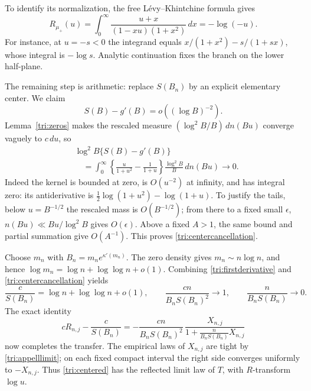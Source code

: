To identify its normalization, the free Lévy--Khintchine formula gives
\[
 R_{\mu_+}(u)=\int_0^\infty
                  \frac{u+x}{(1-xu)(1+x^2)}\,dx=-\log(-u).
\]
For instance, at $u=-s<0$ the integrand equals
$x/(1+x^2)-s/(1+sx)$, whose integral is $-\log s$.
Analytic continuation fixes the branch on the lower half-plane.

The remaining step is arithmetic: replace $S(B_n)$ by an explicit
elementary center.  We claim
\begin{equation}\label{tri:centercancellation}
 S(B)-g'(B)=o((\log B)^{-2}).
\end{equation}
Lemma~\ref{tri:zeros} makes the rescaled measure
$(\log^2B/B)\,dn(Bu)$ converge vaguely to $c\,du$, so
\[
 \begin{split}
 &\log^2B\{S(B)-g'(B)\}\\
 &\quad=\int_0^\infty
 \left\{\frac u{1+u^2}-\frac1{1+u}\right\}
               \frac{\log^2B}{B}\,dn(Bu)
 \longrightarrow0.
 \end{split}
\]
Indeed the kernel is bounded at zero, is $O(u^{-2})$ at infinity,
and has integral zero: its antiderivative is
$\tfrac12\log(1+u^2)-\log(1+u)$.
To justify the tails, below $u=B^{-1/2}$ the rescaled mass is
$O(B^{-1/2})$; from there to a fixed small $\epsilon$,
$n(Bu)\ll Bu/\log^2B$ gives $O(\epsilon)$.
Above a fixed $A>1$, the same bound and partial summation give
$O(A^{-1})$.  This proves \eqref{tri:centercancellation}.

Choose $m_n$ with $B_n=m_ne^{\kappa'(m_n)}$.
The zero density gives $m_n\sim n\log n$, and hence
$\log m_n=\log n+\log\log n+o(1)$.
Combining \eqref{tri:firstderivative} and
\eqref{tri:centercancellation} yields
\begin{equation}\label{tri:center}
 \frac c{S(B_n)}=\log n+\log\log n+o(1),\qquad
 \frac{cn}{B_nS(B_n)^2}\to1,\qquad
 \frac n{B_nS(B_n)}\to0.
\end{equation}
The exact identity
\[
 cR_{n,j}-\frac c{S(B_n)}
 =-\frac{cn}{B_nS(B_n)^2}\,
       \frac{X_{n,j}}{1+\frac n{B_nS(B_n)}X_{n,j}}
\]
now completes the transfer.  The empirical laws of $X_{n,j}$ are
tight by \eqref{tri:appelllimit}; on each fixed compact interval
the right side converges uniformly to $-X_{n,j}$.
Thus \eqref{tri:centered} has the reflected limit law of $T$,
with $R$-transform $\log u$.

